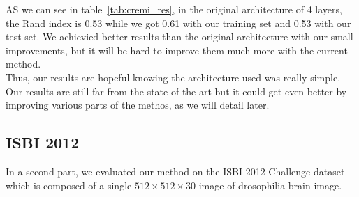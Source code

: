 AS we can see in table~\ref{tab:cremi_res}, in the original architecture of 4 layers, 
the Rand index is 0.53 while we got 0.61 with our training set and 0.53 with our test set.
We achievied better results than the original architecture with our small
improvements, but it will be hard to improve them much more with the current
method.\\

Thus, our results are hopeful knowing the architecture used was really simple.\\ 
Our results are still far from the state of the art but it could get even
better by improving various parts of the methos, as we will detail later.\\

\subsection{ISBI 2012}

In a second part, we evaluated our method on the ISBI 2012 Challenge dataset
which is composed of a single $512\times512\times30$ image of drosophilia brain
image.\\

